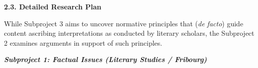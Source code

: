 \noindent\textbf{\large 2.3. Detailed Research Plan}

\noindent While Subproject 3 aims to uncover normative principles that
(\emph{de facto}) guide content ascribing interpretations as conducted
by literary scholars, the Subproject 2 examines arguments in
support of such principles.


\vspace{.2cm}
\noindent\textbf{\emph{Subproject 1: Factual Issues (Literary Studies / Fribourg)}}
\vspace{.1cm}
